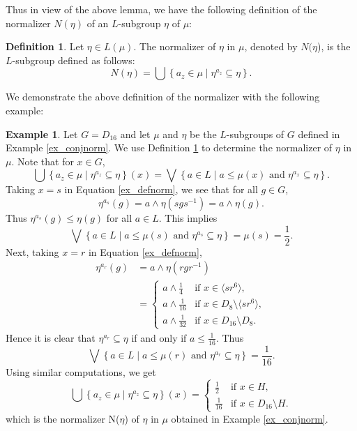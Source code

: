 \documentclass[10pt]{article}
\theoremstyle{plain}
\theoremstyle{definition}
\newtheorem{definition}[theorem]{Definition}
\newtheorem{example}{\sc Example}
\theoremstyle{remark}
\theoremstyle{case}
\begin{document}
\noindent Thus in view of the above lemma, we have the following definition of the normalizer $N(\eta)$ of an $L$-subgroup $\eta$ of $\mu$:

\begin{definition}\label{def_conjnorm}
	Let $\eta \in L(\mu)$. The normalizer of $\eta$ in $\mu$, denoted by $N(\eta$), is the $L$-subgroup defined as follows:
	\[ N(\eta) = \bigcup \left\{ a_z \in \mu \mid  \eta^{a_z} \subseteq \eta \right\}. \]
\end{definition}

\noindent We demonstrate the above definition of the normalizer with the following example:

\begin{example}
	Let $G=D_{16}$ and let $\mu$ and $\eta$ be the $L$-subgroups of $G$ defined in Example \ref{ex_conjnorm}. We use Definition \ref{def_conjnorm} to determine the normalizer of $\eta$ in $\mu$. Note that for $x \in G$,
	\begin{equation}\label{ex_defnorm}
		 \bigcup \left\{ a_z \in \mu \mid  \eta^{a_z} \subseteq \eta \right\}(x) = \bigvee \left\{ a \in L \mid a \leq \mu(x) \text{ and } \eta^{a_x} \subseteq \eta \right\} . 
	\end{equation}
	Taking $x = s$ in Equation \ref{ex_defnorm}, we see that for all $g \in G$,
	\[ \eta^{a_s}(g) = a \wedge \eta(sgs^{-1}) = a \wedge \eta(g). \]
	Thus $\eta^{a_s}(g) \leq \eta(g)$ for all $a \in L$. This implies
	\[ \bigvee \left\{ a \in L \mid a \leq \mu(s) \text{ and } \eta^{a_s} \subseteq \eta \right\} = \mu(s) = \frac{1}{2}. \]
	Next, taking $x=r$ in Equation \ref{ex_defnorm},
	\begin{equation*}
	\begin{split}
		\eta^{a_r}(g) &= a \wedge \eta(rgr^{-1}) \\
		& = \begin{cases}
			a \wedge \frac{1}{4} &\text{if } x \in \langle sr^6 \rangle, \\
			a \wedge \frac{1}{16} &\text{if } x \in D_8 \setminus \langle sr^6 \rangle,\\
			a \wedge \frac{1}{32} &\text{if } x \in D_{16} \setminus D_8.
		\end{cases}
	\end{split} 	 
	\end{equation*}
	Hence it is clear that $\eta^{a_r} \subseteq \eta$ if and only if $a \leq \frac{1}{16}$. Thus
	\[ \bigvee \left\{ a \in L \mid a \leq \mu(r) \text{ and } \eta^{a_r} \subseteq \eta \right\} =  \frac{1}{16}. \]
	Using similar computations, we get
	\[ \bigcup \left\{ a_z \in \mu \mid  \eta^{a_z} \subseteq \eta \right\}(x) = \begin{cases}
		\frac{1}{2} &\text{if } x \in H, \\
		\frac{1}{16} &\text{if } x \in D_{16} \setminus H.
	\end{cases} \]
	which is the normalizer N($\eta$) of $\eta$ in $\mu$ obtained in Example \ref{ex_conjnorm}.
\end{example}
\end{document}
